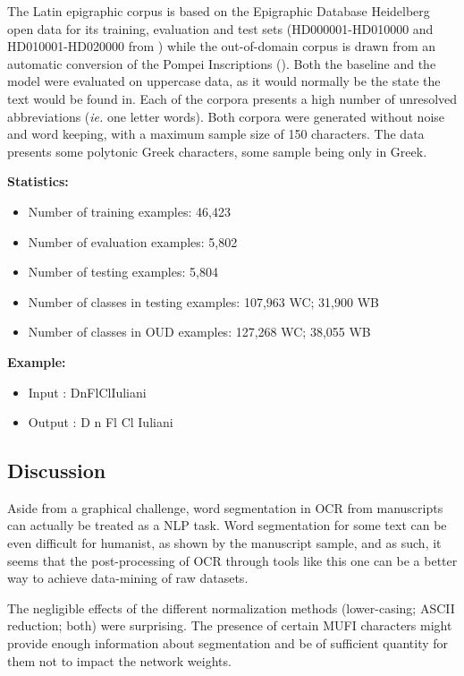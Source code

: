 \documentclass{jdmdh}
\begin{document}

The Latin epigraphic corpus is based on the Epigraphic Database Heidelberg open data \citet{formulae} for its training, evaluation and test sets (HD000001-HD010000 and HD010001-HD020000 from \citet{edh}) while the out-of-domain corpus is drawn from an automatic conversion of the Pompei Inscriptions (\citet{pompei}). Both the baseline and the model were evaluated on uppercase data, as it would normally be the state the text would be found in. Each of the corpora presents a high number of unresolved abbreviations (\textit{ie.} one letter words). Both corpora were generated without noise and word keeping, with a maximum sample size of 150 characters. The data presents some polytonic Greek characters, some sample being only in Greek.

\textbf{Statistics:}

\begin{itemize}
\item Number of training examples: 46,423
\item Number of evaluation examples: 5,802
\item Number of testing examples: 5,804
\item Number of classes in testing examples: 107,963 WC; 31,900 WB
\item Number of classes in OUD examples: 127,268 WC; 38,055 WB
\end{itemize}

\textbf{Example:}

\begin{itemize}
    \item Input : DnFlClIuliani 
    \item Output : D n Fl Cl Iuliani
\end{itemize}

\subsection{Discussion}

Aside from a graphical challenge, word segmentation in OCR from manuscripts can actually be treated as a NLP task. Word segmentation for some text can be even difficult for humanist, as shown by the manuscript sample, and as such, it seems that the post-processing of OCR through tools like this one can be a better way to achieve data-mining of raw datasets.

The negligible effects of the different normalization methods (lower-casing; ASCII reduction; both) were surprising. The presence of certain MUFI characters might provide enough information about segmentation and be of sufficient quantity for them not to impact the network weights. 
\end{document}
